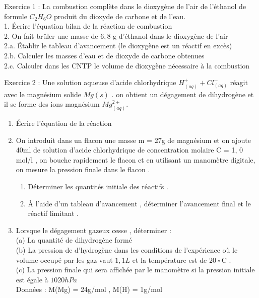 \documentclass[12pt, french]{article}
\begin{document}
\begin{center}
\end{center}


   \begin{Box2}{Exercice 1 : }
La combustion complète dans le dioxygène de l’air de l’éthanol de formule $C_2H_6O$ produit du dioxyde de
carbone et de l’eau.
\\1. Écrire l’équation bilan de la réaction de combustion
\\2. On fait brûler une masse de $6,8$ g d’éthanol dans le dioxygène de l’air
\\ 2.a. Établir le tableau d'avancement (le dioxygène est un réactif en excès)
\\ 2.b. Calculer les masses d’eau et de dioxyde de carbone obtenues
\\ 2.c. Calculer dans les CNTP le volume de dioxygène nécessaire à la combustion
   \end{Box2}


\begin{Box2}{Exercice 2 : }
   Une solution aqueuse d’acide chlorhydrique $H^+_{(aq)} + Cl^{-}_{(aq)}$ réagit avec le magnésium solide $Mg(s)$ . on obtient un dégagement de dihydrogène et il se forme des ions magnésium $Mg^{2+}_{(aq)}$.
   \begin{enumerate}
   \item  Écrire l’équation de la réaction
   \item On introduit dans un flacon une masse m = 27g de magnésium et on ajoute 40ml de solution d’acide chlorhydrique de concentration molaire C = 1, 0 mol/l , on bouche rapidement le flacon et en utilisant un manomètre digitale, on mesure la pression finale dans le flacon .
      \begin{enumerate}
         \item Déterminer les quantités initiale des réactifs .
         \item À l’aide d’un tableau d’avancement , déterminer l’avancement final et le réactif limitant .
      \end{enumerate}
\item Lorsque le dégagement gazeux cesse , déterminer :
   \\(a) La quantité de dihydrogène formé
   \\(b) La pression de d’hydrogène dans les conditions de l’expérience où le volume occupé
par les gaz vaut $1, 1L$ et la température est de 20◦C .
   \\(c) La pression finale qui sera affichée par le manomètre si la pression initiale est égale à $1020hPa$
\\Données : M(Mg) = 24g/mol , M(H) = 1g/mol
\end{enumerate}
\end{Box2}
\end{document}
